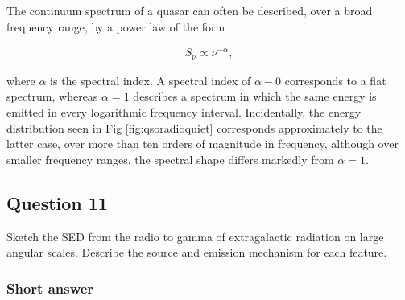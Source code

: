 \documentclass[a4paper,11pt]{article}
\begin{document}
{\noindent}The continuum spectrum of a quasar can often be described, over a broad frequency range, by a power law of the form

\begin{align*}
    S_\nu \propto \nu^{-\alpha},
\end{align*}

{\noindent}where $\alpha$ is the spectral index. A spectral index of $\alpha-0$ corresponds to a flat spectrum, whereas $\alpha=1$ describes a spectrum in which the same energy is emitted in every logarithmic frequency interval. Incidentally, the energy distribution seen in Fig \ref{fig:qsoradioquiet} corresponds approximately to the latter case, over more than ten orders of magnitude in frequency, although over smaller frequency ranges, the spectral shape differs markedly from $\alpha=1$.



\newpage
\subsection{Question 11}

Sketch the SED from the radio to gamma of extragalactic radiation on large angular scales. Describe the source and emission mechanism for each feature.

\subsubsection{Short answer}
\end{document}
